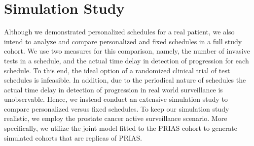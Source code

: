 \section{Simulation Study}
\label{sec:sim_study}
Although we demonstrated personalized schedules for a real patient, we also intend to analyze and compare personalized and fixed schedules in a full study cohort. We use two measures for this comparison, namely, the number of invasive tests in a schedule, and the actual time delay in detection of progression for each schedule. To this end, the ideal option of a randomized clinical trial of test schedules is infeasible. In addition, due to the periodical nature of schedules the actual time delay in detection of progression in real world surveillance is unobservable. Hence, we instead conduct an extensive simulation study to compare personalized versus fixed schedules. To keep our simulation study realistic, we employ the prostate cancer active surveillance scenario. More specifically, we utilize the joint model fitted to the PRIAS cohort to generate simulated cohorts that are replicas of PRIAS.

